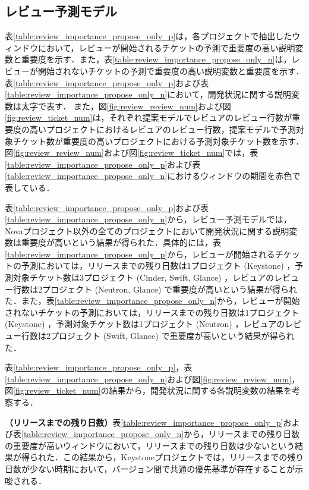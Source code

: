 \documentclass[submit]{ipsj}
\begin{document}
\subsection{レビュー予測モデル}\label{sec:rq2_kousatu_review}
表\ref{table:review_importance_propose_only_p}は，各プロジェクトで抽出したウィンドウにおいて，レビューが開始されるチケットの予測で重要度の高い説明変数と重要度を示す．また，表\ref{table:review_importance_propose_only_n}は，レビューが開始されないチケットの予測で重要度の高い説明変数と重要度を示す．表\ref{table:review_importance_propose_only_p}および表\ref{table:review_importance_propose_only_n}において，開発状況に関する説明変数は太字で表す．
また，図\ref{fig:review_review_num}および図\ref{fig:review_ticket_num}は，それぞれ提案モデルでレビュアのレビュー行数が重要度の高いプロジェクトにおけるレビュアのレビュー行数，提案モデルで予測対象チケット数が重要度の高いプロジェクトにおける予測対象チケット数を示す．図\ref{fig:review_review_num}および図\ref{fig:review_ticket_num}では，表\ref{table:review_importance_propose_only_p}および表\ref{table:review_importance_propose_only_n}におけるウィンドウの期間を赤色で表している．

表\ref{table:review_importance_propose_only_p}および表\ref{table:review_importance_propose_only_n}から，レビュー予測モデルでは，Novaプロジェクト以外の全てのプロジェクトにおいて開発状況に関する説明変数は重要度が高いという結果が得られた．具体的には，表\ref{table:review_importance_propose_only_p}から，レビューが開始されるチケットの予測においては，リリースまでの残り日数は1プロジェクト (Keystone) ，予測対象チケット数は3プロジェクト (Cinder, Swift, Glance) ，レビュアのレビュー行数は2プロジェクト (Neutron, Glance) で重要度が高いという結果が得られた．また，表\ref{table:review_importance_propose_only_n}から，レビューが開始されないチケットの予測においては，リリースまでの残り日数は1プロジェクト (Keystone) ，予測対象チケット数は1プロジェクト (Neutron) ，レビュアのレビュー行数は2プロジェクト (Swift, Glance) で重要度が高いという結果が得られた．

表\ref{table:review_importance_propose_only_p}，表\ref{table:review_importance_propose_only_n}および図\ref{fig:review_review_num}，図\ref{fig:review_ticket_num}の結果から，開発状況に関する各説明変数の結果を考察する．

\textbf{（リリースまでの残り日数）}表\ref{table:review_importance_propose_only_p}および表\ref{table:review_importance_propose_only_n}から，リリースまでの残り日数の重要度が高いウィンドウにおいて，リリースまでの残り日数は少ないという結果が得られた．この結果から，Keystoneプロジェクトでは，リリースまでの残り日数が少ない時期において，バージョン間で共通の優先基準が存在することが示唆される．
\end{document}
